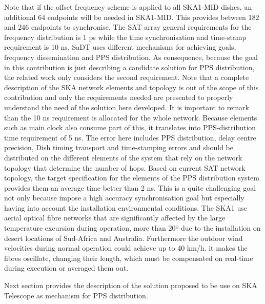 Note that if the offset frequency scheme is applied to all SKA1-MID dishes, an additional 64 endpoints will be needed in SKA1-MID. This provides between 182 and 246 endpoints to synchronise. 
The SAT array general requirements for the frequency distribution is 1 ps while the time synchronisation and time-stamp requirement is 10 ns. SaDT uses different mechanisms for achieving goals, frequency dissemination and PPS distribution. As consequence, because the goal in this contribution is just describing a  candidate solution for PPS distribution, the related work only considers the second requirement. Note that a complete description of the SKA network elements and topology is out of the scope of this contribution and only the requirements needed are presented to properly understand the need of the solution here developed. 
It is important to remark than the 10 ns requirement is allocated for the whole 
network. Because elements such as main clock also consume part of this, it 
translates into PPS-distribution time requirement of 5 ns. The error here 
includes PPS distribution, delay centre precision, Dish timing transport and 
time-stamping errors and should be distributed on the different elements of the 
system that rely on the network topology that determine the number of hops. 
Based on current SAT network topology, the target specification for the 
elements of the PPS distribution system provides them an average time better 
than 2 ns. This is a quite challenging goal not only because impose a high 
accuracy synchronisation goal but especially having into account the 
installation environmental conditions. The SKA1 use aerial optical fibre 
networks that are significantly affected by the large temperature excursion 
during operation, more than 20º due to the installation on desert locations of 
Sud-Africa and Australia. Furthermore the outdoor wind velocities during normal 
operation could achieve up to 40 km/h. it makes the fibres oscillate, changing 
their length, which must be compensated on real-time during execution or 
averaged them out. 

Next section provides the description of the solution proposed to be use on SKA Telescope as mechanism for PPS distribution. 


